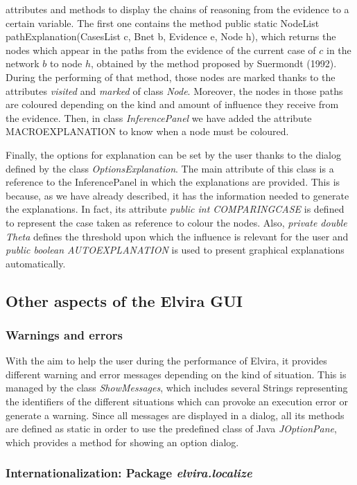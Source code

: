 \begin{itemize}
attributes and methods to display the chains of reasoning from the
evidence to a certain variable. The first one contains the method
public static NodeList pathExplanation(CasesList c, Bnet b,
Evidence e, Node h), which returns the nodes which appear in the
paths from the evidence of the current case of $c$ in the network
$b$ to node $h$, obtained by the method proposed by Suermondt
(1992). During the performing of that method, those nodes are
marked thanks to the attributes \emph{visited} and \emph{marked}
of class \emph{Node}. Moreover, the nodes in those paths are
coloured depending on the kind and amount of influence they
receive from the evidence. Then, in class \emph{InferencePanel} we
have added the attribute MACROEXPLANATION to know when a node must
be coloured.
\end{itemize}

Finally, the options for explanation can be set by the user thanks
to the dialog defined by the class \emph{OptionsExplanation}. The
main attribute of this class is a reference to the InferencePanel
in which the explanations are provided. This is because, as we
have already described, it has the information needed to generate
the explanations. In fact, its attribute \emph{public int
COMPARINGCASE} is defined to represent the case taken as reference
to colour the nodes. Also, \emph{private double Theta} defines the
threshold upon which the influence is relevant for the user and
\emph{public boolean AUTOEXPLANATION} is used to present graphical
explanations automatically.

\subsection{Other aspects of the Elvira GUI}
\subsubsection{Warnings and errors}
With the aim to help the user during the performance of Elvira, it
provides different warning and error messages depending on the
kind of situation. This is managed by the class
\emph{ShowMessages}, which includes several Strings representing
the identifiers of the different situations which can provoke an
execution error or generate a warning. Since all messages are
displayed in a dialog, all its methods are defined as static in
order to use the predefined class of Java \emph{JOptionPane},
which provides a method for showing an option dialog.

\subsubsection{Internationalization: Package
\emph{elvira.localize}}

